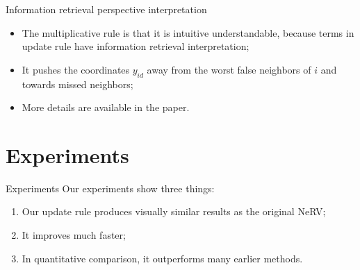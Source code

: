 \documentclass[first=dgreen,second=purple,logo=yellowexc]{aaltoslides}
\begin{document}
\begin{frame}{Information retrieval perspective interpretation}
\begin{itemize}
\item The  multiplicative rule is that it is intuitive understandable, because terms in update rule have information retrieval interpretation;
\item It pushes the coordinates $y_{id}$ away from the worst false neighbors of $i$ and towards missed neighbors;
\item More details are available in the paper.
\end{itemize}
\end{frame}

\section{Experiments}
\begin{frame}{Experiments}
Our experiments show three things: 
\begin{enumerate}
\item Our update rule produces visually similar results as the original NeRV;
\item It improves much faster;
\item In quantitative comparison, it outperforms many earlier methods.
\end{enumerate}
\end{frame}
\end{document}
